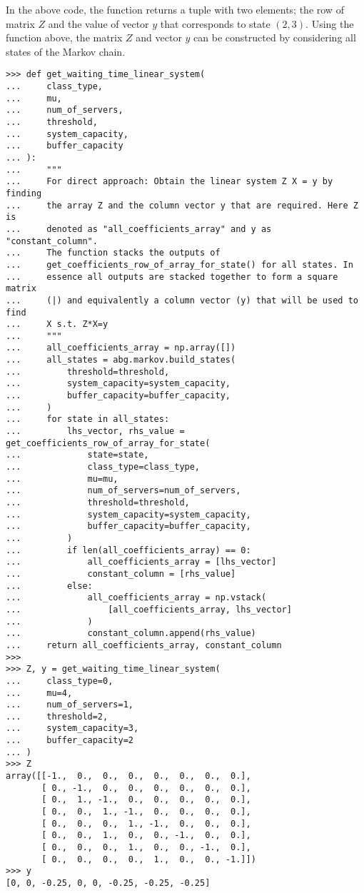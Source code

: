 In the above code, the function returns a tuple with two elements; the row of
matrix \(Z\) and the value of vector \(y\) that corresponds to state \((2,3)\).
Using the function above, the matrix \(Z\) and vector \(y\) can be constructed
by considering all states of the Markov chain.

\begin{lstlisting}[style=pystyle]
>>> def get_waiting_time_linear_system(
...     class_type,
...     mu,
...     num_of_servers,
...     threshold,
...     system_capacity,
...     buffer_capacity
... ):
...     """
...     For direct approach: Obtain the linear system Z X = y by finding
...     the array Z and the column vector y that are required. Here Z is
...     denoted as "all_coefficients_array" and y as "constant_column".
...     The function stacks the outputs of
...     get_coefficients_row_of_array_for_state() for all states. In
...     essence all outputs are stacked together to form a square matrix
...     (|) and equivalently a column vector (y) that will be used to find
...     X s.t. Z*X=y
...     """
...     all_coefficients_array = np.array([])
...     all_states = abg.markov.build_states(
...         threshold=threshold,
...         system_capacity=system_capacity,
...         buffer_capacity=buffer_capacity,
...     )
...     for state in all_states:
...         lhs_vector, rhs_value = get_coefficients_row_of_array_for_state(
...             state=state,
...             class_type=class_type,
...             mu=mu,
...             num_of_servers=num_of_servers,
...             threshold=threshold,
...             system_capacity=system_capacity,
...             buffer_capacity=buffer_capacity,
...         )
...         if len(all_coefficients_array) == 0:
...             all_coefficients_array = [lhs_vector]
...             constant_column = [rhs_value]
...         else:
...             all_coefficients_array = np.vstack(
...                 [all_coefficients_array, lhs_vector]
...             )
...             constant_column.append(rhs_value)
...     return all_coefficients_array, constant_column
>>>
>>> Z, y = get_waiting_time_linear_system(
...     class_type=0,
...     mu=4,
...     num_of_servers=1,
...     threshold=2,
...     system_capacity=3,
...     buffer_capacity=2
... )
>>> Z
array([[-1.,  0.,  0.,  0.,  0.,  0.,  0.,  0.],
       [ 0., -1.,  0.,  0.,  0.,  0.,  0.,  0.],
       [ 0.,  1., -1.,  0.,  0.,  0.,  0.,  0.],
       [ 0.,  0.,  1., -1.,  0.,  0.,  0.,  0.],
       [ 0.,  0.,  0.,  1., -1.,  0.,  0.,  0.],
       [ 0.,  0.,  1.,  0.,  0., -1.,  0.,  0.],
       [ 0.,  0.,  0.,  1.,  0.,  0., -1.,  0.],
       [ 0.,  0.,  0.,  0.,  1.,  0.,  0., -1.]])
>>> y
[0, 0, -0.25, 0, 0, -0.25, -0.25, -0.25]

\end{lstlisting}

